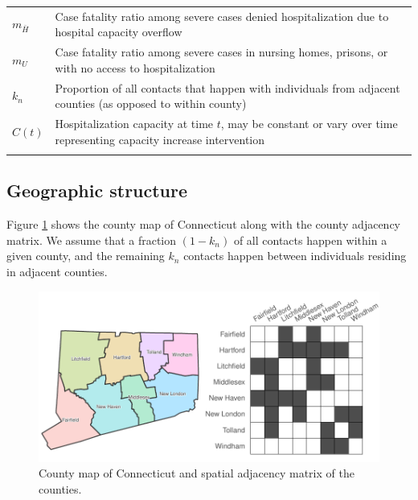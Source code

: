 \documentclass[11pt]{article}
\newcommand{\comments}[1]{[\textcolor{red}{#1}]}
\begin{document}
\begin{spacing}{0.9}
\begin{longtable}[H] {p{} p{} }
	$m_{\bar{H}}$ & Case fatality ratio among severe cases denied hospitalization due to hospital capacity overflow \\[0.5em]
	$m_{U}$ & Case fatality ratio among severe cases in nursing homes, prisons, or with no access to hospitalization \\[0.5em]
	$k_n$ & Proportion of all contacts that happen with individuals from adjacent counties (as opposed to within county) \\[0.5em]
	$C(t)$ & Hospitalization capacity at time $t$, may be constant or vary over time representing capacity increase intervention\\
	\hline
	\label{table:params}
\end{longtable}
\end{spacing}



\subsection{Geographic structure}

Figure \ref{fig:map} shows the county map of Connecticut along with the county adjacency matrix. We assume that a fraction $(1-k_n)$ of all contacts happen within a given county, and the remaining $k_n$ contacts happen between individuals residing in adjacent counties.

\begin{figure}[htb]
	\centering
	\includegraphics[width=.7\textwidth]{figures/map_adj.pdf}
	\caption{County map of Connecticut and spatial adjacency matrix of the counties.}
	\label{fig:map}
\end{figure}


\end{document}
